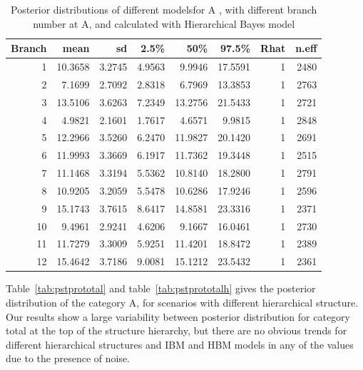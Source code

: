 \begin{table}[!h]
	\centering
	\begin{tabular}{rrrrrrrr}
		\hline
		Branch & mean & sd & 2.5\% & 50\% & 97.5\% & Rhat & n.eff \\ 
		\hline
		1 & 10.3658 & 3.2745 & 4.9563 & 9.9946 & 17.5591 & 1 & 2480 \\ 
		2 & 7.1699 & 2.7092 & 2.8318 & 6.7969 & 13.3853 & 1 & 2763 \\ 
		3 & 13.5106 & 3.6263 & 7.2349 & 13.2756 & 21.5433 & 1 & 2721 \\ 
		4 & 4.9821 & 2.1601 & 1.7617 & 4.6571 & 9.9815 & 1 & 2848 \\ 
		5 & 12.2966 & 3.5260 & 6.2470 & 11.9827 & 20.1420 & 1 & 2691 \\ 
		6 & 11.9993 & 3.3669 & 6.1917 & 11.7362 & 19.3448 & 1 & 2515 \\ 
		7 & 11.1468 & 3.3194 & 5.5362 & 10.8140 & 18.2800 & 1 & 2791 \\ 
		8 & 10.9205 & 3.2059 & 5.5478 & 10.6286 & 17.9246 & 1 & 2596 \\ 
		9 & 15.1743 & 3.7615 & 8.6417 & 14.8581 & 23.3316 & 1 & 2371 \\ 
		10 & 9.4961 & 2.9241 & 4.6206 & 9.1667 & 16.0461 & 1 & 2730 \\ 
		11 & 11.7279 & 3.3009 & 5.9251 & 11.4201 & 18.8472 & 1 & 2389 \\ 
		12 & 15.4642 & 3.7186 & 9.0081 & 15.1212 & 23.5432 & 1 & 2361 \\ 
		\hline
	\end{tabular}
	\caption{Posterior distributions of different modelsfor A , with different branch number at A, and calculated with Hierarchical Bayes model} 
	\label{tab:pstproAh}
\end{table}

Table~\ref{tab:pstprototal} and table~\ref{tab:pstprototalh} gives the posterior distribution of the category A, for scenarios with different hierarchical structure. Our results show a large variability between posterior distribution for category total at the top of the structure hierarchy, but there are no obvious trends for different hierarchical structures and IBM and HBM models in any of the values due to the presence of noise. 

\newpage

